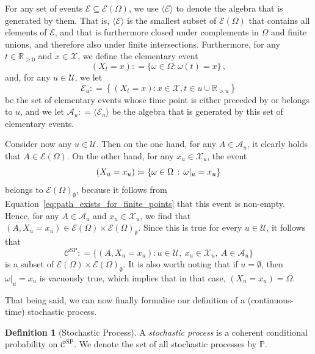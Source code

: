 \documentclass[10pt,a4paper]{paper}
\theoremstyle{definition}
\newtheorem{definition}{Definition}
\newcommand{\reals}{\mathbb{R}}
\newcommand{\realsnonneg}{\reals_{\geq 0}}
\newcommand{\states}{\mathcal{X}}
\newcommand{\paths}{\Omega}
\newcommand{\power}{\mathcal{E}(\paths)}
\newcommand{\nonemptypower}{\power_{\emptyset}}
\newcommand{\processes}{\mathbb{P}}
\newcommand{\coloneqq}{:\!=}
\begin{document}
For any set of events $\mathcal{E}\subseteq\power$, we use $\langle\mathcal{E}\rangle$ to denote the algebra that is generated by them. That is, $\langle\mathcal{E}\rangle$ is the smallest subset of $\power$ that contains all elements of $\mathcal{E}$, and that is furthermore closed under complements in $\Omega$ and finite unions, and therefore also under finite intersections. 
Furthermore, for any $t\in\realsnonneg$ and $x\in\states$, we define the elementary event
\begin{equation*}
(X_t=x)\coloneqq\{\omega\in\paths\colon\omega(t)=x\}\,,
\end{equation*}
and, for any $u\in\mathcal{U}$, we let
\begin{equation*}
\mathcal{E}_u \coloneqq \left\{
(X_t=x)
\colon
x\in\states,t\in u\cup\reals_{>u}
\right\}
\end{equation*}
be the set of elementary events whose time point is either preceded by or belongs to $u$, and we let $\mathcal{A}_u\coloneqq\langle\mathcal{E}_u\rangle$ be the algebra that is generated by this set of elementary events. 

Consider now any $u\in\mathcal{U}$. Then on the one hand, for any $A\in\mathcal{A}_u$, it clearly holds that $A\in\power$. On the other hand, for any $x_u\in\states_u$, the event
\begin{equation*}
(X_u=x_u) \coloneqq \{\omega\in\Omega\,:\,\omega\vert_u=x_u\}
\vspace{4pt}
\end{equation*}
belongs to $\nonemptypower$, because it follows from Equation~\eqref{eq:path_exists_for_finite_points} that this event is non-empty. 
Hence, for any $A\in\mathcal{A}_u$ and $x_u\in\states_u$, we find that $(A,X_u=x_u)\in\power\times\nonemptypower$. Since this is true for every $u\in\mathcal{U}$, it follows that
\begin{equation*}
\mathcal{C}^\mathrm{SP}\coloneqq\big\{
(A,X_u=x_u)
\colon
u\in\mathcal{U},~x_u\in\states_u,~A\in\mathcal{A}_u\big\}
\end{equation*}
is a subset of $\power\times\nonemptypower$. It is also worth noting that if $u=\emptyset$, then $\omega\vert_u=x_u$ is vacuously true, which implies that in that case, $(X_u=x_u)=\Omega$.

That being said, we can now finally formalise our definition of a (continuous-time) stochastic process.

\begin{definition}[Stochastic Process]\label{def:stoch_process}
A \emph{stochastic process} is a coherent conditional probability on $\mathcal{C}^\mathrm{SP}$. We denote the set of all stochastic processes by $\processes$.
\end{definition}
\end{document}
